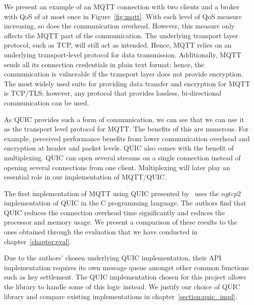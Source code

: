 We present an example of an MQTT connection with two clients and a broker with QoS of at most once in Figure~\ref{fig:mqtt}.
With each level of QoS measure increasing, so does the communication overhead.
However, this measure only affects the MQTT part of the communication.
The underlying transport layer protocol, such as TCP, will still act as intended.
Hence, MQTT relies on an underlying transport-level protocol for data transmission.
Additionally, MQTT sends all its connection credentials in plain text format; hence, the communication is vulnerable if the transport layer does not provide encryption.
The most widely used suite for providing data transfer and encryption for MQTT is TCP/TLS; however, any protocol that provides lossless, bi-directional communication can be used.

As QUIC provides such a form of communication, we can see that we can use it as the transport level protocol for MQTT.
The benefits of this are numerous. 
For example, perceived performance benefits from lower communication overhead and encryption at header and packet levels.
QUIC also comes with the benefit of multiplexing.
QUIC can open several streams on a single connection instead of opening several connections from one client.
Multiplexing will later play an essential role in our implementation of MQTT/QUIC.

The first implementation of MQTT using QUIC presented by~\cite{kumar_implementation_2019} uses the $ngtcp2$ implementation of QUIC in the C programming language.
The authors find that QUIC reduces the connection overhead time significantly and reduces the processor and memory usage.
We present a comparison of these results to the ones obtained through the evaluation that we have conducted in chapter~\ref{chapter:eval}.

Due to the authors' chosen underlying QUIC implementation, their API implementation requires its own message queue amongst other common functions such as key settlement.
The QUIC implementation chosen for this project allows the library to handle some of this logic instead.
We justify our choice of QUIC library and compare existing implementations in chapter~\ref{section:quic_impl}.